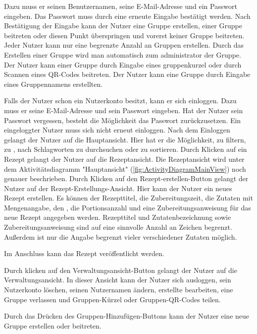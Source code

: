 \documentclass[parskip=full]{scrartcl}
\begin{document}
Dazu muss er seinen Benutzernamen, seine E-Mail-Adresse und ein Passwort eingeben.
Das Passwort muss durch eine erneute Eingabe bestätigt werden.
Nach Bestätigung der Eingabe kann der Nutzer eine Gruppe erstellen, einer Gruppe beitreten oder diesen Punkt überspringen und vorerst keiner Gruppe beitreten. Jeder Nutzer kann nur eine begrenzte Anzahl an Gruppen erstellen.
Durch das Erstellen einer Gruppe wird man automatisch zum \gls{administrator} der Gruppe.
Der Nutzer kann einer Gruppe durch Eingabe eines \gls{gruppenkurzel} oder durch Scannen eines QR-Codes beitreten.
Der Nutzer kann eine Gruppe durch Eingabe eines Gruppennamens erstellten.

Falls der Nutzer schon ein Nutzerkonto besitzt, kann er sich einloggen.
Dazu muss er seine E-Mail-Adresse und sein Passwort eingeben.
Hat der Nutzer sein Passwort vergessen, besteht die Möglichkeit das Passwort zurückzusetzen.
Ein eingeloggter Nutzer muss sich nicht erneut einloggen.\newline
Nach dem Einloggen gelangt der Nutzer auf die Hauptansicht.
Hier hat er die Möglichkeit,  zu filtern, zu , nach Schlagworten zu durchsuchen oder zu sortieren.
Durch Klicken auf ein Rezept gelangt der Nutzer auf die Rezeptansicht.
Die Rezeptansicht wird unter dem Aktivitätsdiagramm "Hauptansicht" (\autoref{fig:ActivityDiagramMainView}) noch genauer beschrieben.
Durch Klicken auf den Rezept-erstellen-Button gelangt der Nutzer auf der Rezept-Erstellungs-Ansicht.
Hier kann der Nutzer ein neues Rezept erstellen.
Es können der Rezepttitel, die Zubereitungszeit, die Zutaten mit Mengenangabe, den , die Portionsanzahl und eine
Zubereitungsanweisung für das neue Rezept angegeben werden. Rezepttitel und Zutatenbezeichnung sowie Zubereitungsanweisung sind auf eine sinnvolle Anzahl an Zeichen begrenzt. Außerdem ist nur die Angabe begrenzt vieler verschiedener Zutaten möglich.

Im Anschluss kann das Rezept veröffentlicht werden.\par
Durch klicken auf den Verwaltungsansicht-Button
gelangt der Nutzer auf die Verwaltungsansicht.
In dieser Ansicht kann der Nutzer sich ausloggen, sein Nutzerkonto löschen, seinen Nutzernamen ändern,
erstellte  bearbeiten, eine Gruppe verlassen und Gruppen-Kürzel oder Gruppen-QR-Codes teilen.\par
Durch das Drücken des Gruppen-Hinzufügen-Buttons kann der Nutzer eine neue Gruppe erstellen oder beitreten.
\end{document}
